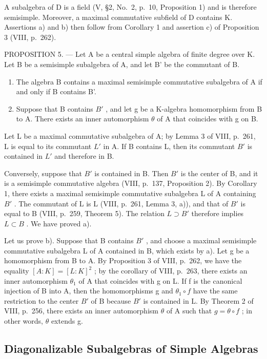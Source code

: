 A subalgebra of D is a field (V, §2, No.~2, p.~10, Proposition 1) and is therefore semisimple. Moreover, a maximal commutative subfield of D contains K. Assertions a) and b) then follow from Corollary 1 and assertion c) of Proposition 3 (VIII, p.~262).

PROPOSITION 5. --- Let A be a central simple algebra of finite degree over K. Let B be a semisimple subalgebra of A, and let B' be the commutant of B.

\begin{enumerate}
\def\labelenumi{\alph{enumi})}
\item
  The algebra B contains a maximal semisimple commutative subalgebra of A if and only if B contains B'.
\item
  Suppose that B contains \(B'\) , and let g be a K-algebra homomorphism from B to A. There exists an inner automorphism \(\theta\) of A that coincides with g on B.
\end{enumerate}

Let L be a maximal commutative subalgebra of A; by Lemma 3 of VIII, p.~261, L is equal to its commutant \(L'\) in A. If B contains L, then its commutant \(B'\) is contained in \(L'\) and therefore in B.

Conversely, suppose that \(B'\) is contained in B. Then \(B'\) is the center of B, and it is a semisimple commutative algebra (VIII, p.~137, Proposition 2). By Corollary 1, there exists a maximal semisimple commutative subalgebra L of A containing \(B'\) . The commutant of L is L (VIII, p.~261, Lemma 3, a)), and that of \(B'\) is equal to B (VIII, p.~259, Theorem 5). The relation \(L \supset B'\) therefore implies \(L \subset B\) . We have proved a).

Let us prove b). Suppose that B contains \(B'\) , and choose a maximal semisimple commutative subalgebra L of A contained in B, which exists by a). Let g be a homomorphism from B to A. By Proposition 3 of VIII, p.~262, we have the equality \([A:K]=[L:K]^{2}\) ; by the corollary of VIII, p.~263, there exists an inner automorphism \(\theta_{1}\) of A that coincides with g on L. If f is the canonical injection of B into A, then the homomorphisms g and \(\theta_{1}\circ f\) have the same restriction to the center \(B'\) of B because \(B'\) is contained in L. By Theorem 2 of VIII, p.~256, there exists an inner automorphism \(\theta\) of A such that \(g=\theta\circ f\) ; in other words, \(\theta\) extends g.

\subsection{Diagonalizable Subalgebras of Simple Algebras}

